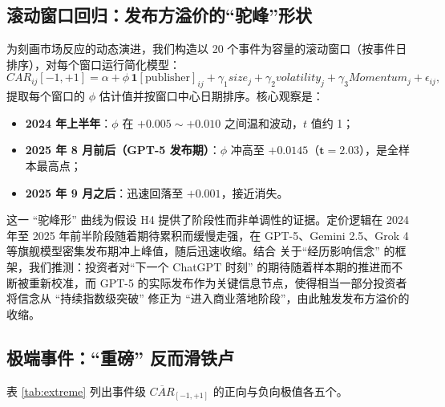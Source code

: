 \documentclass[11pt]{ctexart}
\begin{document}
\subsection{滚动窗口回归：发布方溢价的“驼峰”形状}

为刻画市场反应的动态演进，我们构造以 20 个事件为容量的滚动窗口（按事件日排序），对每个窗口运行简化模型：
\begin{equation}
CAR_{ij}[-1,+1] = \alpha + \phi\,\mathbf{1}[\text{publisher}]_{ij} + \gamma_1 size_j + \gamma_2 volatility_j + \gamma_3 Momentum_j + \epsilon_{ij},
\label{eq:roll}
\end{equation}
提取每个窗口的 $\phi$ 估计值并按窗口中心日期排序。核心观察是：

\begin{itemize}
\item \textbf{2024 年上半年}：$\phi$ 在 $+0.005\sim +0.010$ 之间温和波动，$t$ 值约 1；
\item \textbf{2025 年 8 月前后（GPT-5 发布期）}：$\phi$ 冲高至 $\mathbf{+0.0145}$（$\mathbf{t=2.03}$），是全样本最高点；
\item \textbf{2025 年 9 月之后}：迅速回落至 $+0.001$，接近消失。
\end{itemize}

这一 “驼峰形” 曲线为假设 H4 提供了阶段性而非单调性的证据。定价逻辑在 2024 年至 2025 年前半阶段随着期待累积而缓慢走强，在 GPT-5、Gemini 2.5、Grok 4 等旗舰模型密集发布期冲上峰值，随后迅速收缩。结合 \cite{MalmendierShen2024} 关于“经历影响信念” 的框架，我们推测：投资者对“下一个 ChatGPT 时刻” 的期待随着样本期的推进而不断被重新校准，而 GPT-5 的实际发布作为关键信息节点，使得相当一部分投资者将信念从 “持续指数级突破” 修正为 “进入商业落地阶段”，由此触发发布方溢价的收缩。

\subsection{极端事件：“重磅” 反而滑铁卢}

表 \ref{tab:extreme} 列出事件级 $\overline{CAR}_{[-1,+1]}$ 的正向与负向极值各五个。
\end{document}
